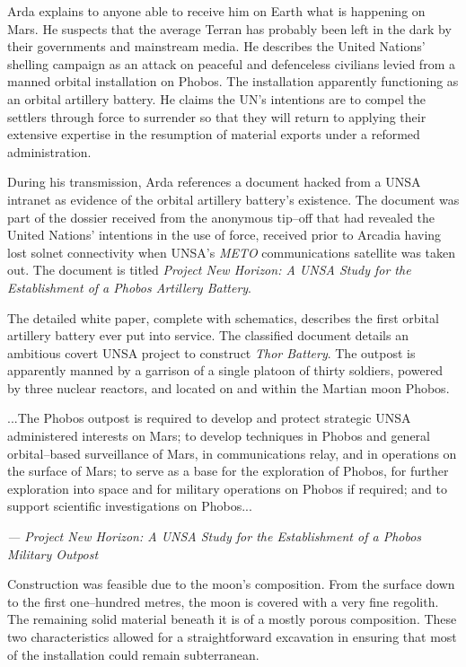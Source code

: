 Arda explains to anyone able to receive him on Earth what is happening on Mars. He suspects that the average Terran has probably been left in the dark by their governments and mainstream media. He describes the United Nations' shelling campaign as an attack on peaceful and defenceless civilians levied from a manned orbital installation on Phobos. The installation apparently functioning as an orbital artillery battery. He claims the UN's intentions are to compel the settlers through force to surrender so that they will return to applying their extensive expertise in the resumption of material exports under a reformed administration.

During his transmission, Arda references a document hacked from a UNSA intranet as evidence of the orbital artillery battery's existence. The document was part of the dossier received from the anonymous tip--off that had revealed the United Nations' intentions in the use of force, received prior to Arcadia having lost solnet connectivity when UNSA's {\it METO} communications satellite was taken out. The document is titled {\it Project New Horizon: A UNSA Study for the Establishment of a Phobos Artillery Battery}.

The detailed white paper, complete with schematics, describes the first orbital artillery battery ever put into service. The classified document details an ambitious covert UNSA project to construct {\it Thor Battery}. The outpost is apparently manned by a garrison of a single platoon of thirty soldiers, powered by three nuclear reactors, and located on and within the Martian moon Phobos. 

\startTimelineGeneralDocument
...The Phobos outpost is required to develop and protect strategic UNSA administered interests on Mars; to develop techniques in Phobos and general orbital--based surveillance of Mars, in communications relay, and in operations on the surface of Mars; to serve as a base for the exploration of Phobos, for further exploration into space and for military operations on Phobos if required; and to support scientific investigations on Phobos...

\hskip 1.5cm {\it --- Project New Horizon: A UNSA Study for the Establishment of a Phobos Military Outpost}
\stopTimelineGeneralDocument

Construction was feasible due to the moon's composition. From the surface down to the first one--hundred metres, the moon is covered with a very fine regolith. The remaining solid material beneath it is of a mostly porous composition. These two characteristics allowed for a straightforward excavation in ensuring that most of the installation could remain subterranean.

